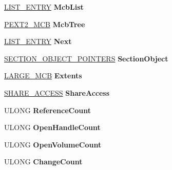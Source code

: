 \begin{DoxyCompactItemize}
\hyperlink{struct___l_i_s_t___e_n_t_r_y}{L\+I\+S\+T\+\_\+\+E\+N\+T\+RY} {\bfseries Mcb\+List}
\item 
\mbox{\label{struct___e_x_t2___v_c_b_afad4196af7a81c894a4558472b35ab6f}} 
\hyperlink{struct___e_x_t2___m_c_b}{P\+E\+X\+T2\+\_\+\+M\+CB} {\bfseries Mcb\+Tree}
\item 
\mbox{\label{struct___e_x_t2___v_c_b_a0ec31f0af45ce6918ace5e2a3fbb7f2f}} 
\hyperlink{struct___l_i_s_t___e_n_t_r_y}{L\+I\+S\+T\+\_\+\+E\+N\+T\+RY} {\bfseries Next}
\item 
\mbox{\label{struct___e_x_t2___v_c_b_a283b3bca478196aa1c0ec7496c4d556b}} 
\hyperlink{struct___s_e_c_t_i_o_n___o_b_j_e_c_t___p_o_i_n_t_e_r_s}{S\+E\+C\+T\+I\+O\+N\+\_\+\+O\+B\+J\+E\+C\+T\+\_\+\+P\+O\+I\+N\+T\+E\+RS} {\bfseries Section\+Object}
\item 
\mbox{\label{struct___e_x_t2___v_c_b_aaeb989ff0848f9a8fb8f244d4750d23f}} 
\hyperlink{struct___l_a_r_g_e___m_c_b}{L\+A\+R\+G\+E\+\_\+\+M\+CB} {\bfseries Extents}
\item 
\mbox{\label{struct___e_x_t2___v_c_b_ac6a968a6475e5968569f728a8db86acf}} 
\hyperlink{struct___s_h_a_r_e___a_c_c_e_s_s}{S\+H\+A\+R\+E\+\_\+\+A\+C\+C\+E\+SS} {\bfseries Share\+Access}
\item 
\mbox{\label{struct___e_x_t2___v_c_b_a6b24009351c2cf50653ac5cf4ae6673e}} 
U\+L\+O\+NG {\bfseries Reference\+Count}
\item 
\mbox{\label{struct___e_x_t2___v_c_b_a91f339268e5dbc28e2c8c31c915067f1}} 
U\+L\+O\+NG {\bfseries Open\+Handle\+Count}
\item 
\mbox{\label{struct___e_x_t2___v_c_b_a36b4dd78a899df944496d0a0bb3c48cf}} 
U\+L\+O\+NG {\bfseries Open\+Volume\+Count}
\item 
\mbox{\label{struct___e_x_t2___v_c_b_ac1b7b01db76c8b8aebadb94e14cc3523}} 
U\+L\+O\+NG {\bfseries Change\+Count}
\item 
\mbox{\label{struct___e_x_t2___v_c_b_ac32efb6709fd3466ac7db5b5b018e61f}} 

\end{DoxyCompactItemize}
